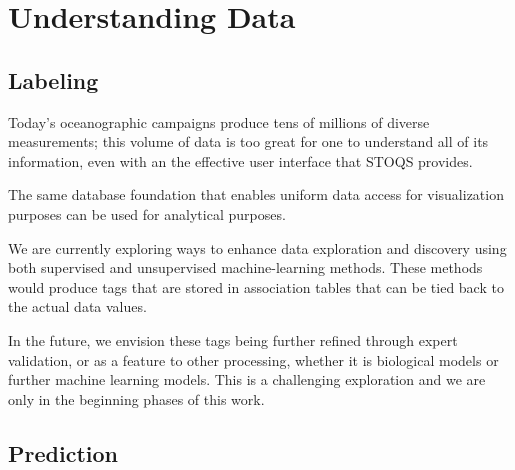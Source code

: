 \section{Understanding Data}

\subsection{Labeling}
Today's oceanographic campaigns produce tens of millions of diverse measurements; this volume of data is too great for one to understand all of its information, even with an the effective user interface that STOQS provides.

The same database foundation that enables uniform data access for visualization purposes can be used for analytical purposes.

We are currently exploring ways to enhance data exploration and discovery using both supervised and unsupervised machine-learning methods.  These methods would produce tags that are stored in association tables that can be tied back to the actual data values.  

In the future, we envision these tags being further refined through expert validation, or as a feature to other processing, whether it is biological models or further machine learning models.  This is a challenging exploration and we are only in the beginning phases of this work. 

\subsection{Prediction}

